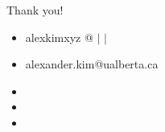 \documentclass{beamer}
\begin{document}
{
%
\begin{frame}{Thank you!}
	\begin{minipage}{0.7\textwidth}
	\begin{itemize}
		\item[]{alexkimxyz @ \href{https://github.com/alexkimxyz}{\faGithub} $\vert$ \href{https://www.linkedin.com/in/alexkimxyz/}{\faLinkedin} $\vert$ \href{https://twitter.com/alexkimxyz}{\faTwitter}}
		\item[]{alexander.kim@ualberta.ca}
		\item[]{}
		\item[]{}
		\item[]{}
  	\end{itemize}
  	\end{minipage}
\end{frame}
}
\end{document}
